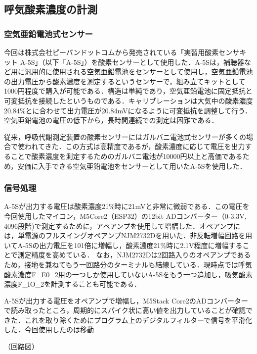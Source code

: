 \subsection{呼気酸素濃度の計測}

\subsubsection{空気亜鉛電池式センサー}

今回は株式会社ピーバンドットコムから発売されている「実習用酸素センサキット A-5S」（以下「A-5S」）を酸素センサーとして使用した．A-5Sは，補聴器など用に汎用的に使用される空気亜鉛電池をセンサーとして使用し，空気亜鉛電池の出力電圧から酸素濃度を測定するというセンサーで，組み立てキットとして1000円程度で購入が可能である．構造は単純であり，空気亜鉛電池に固定抵抗と可変抵抗を接続したというものである．キャリブレーションは大気中の酸素濃度20.84\%とに合わせて出力電圧が20.84mVになるように可変抵抗を調整して行う．空気亜鉛電池の電圧の低下から，長時間連続での測定は困難である．

従来，呼吸代謝測定装置の酸素センサーにはガルバニ電池式センサーが多くの場合で使われてきた．この方式は高精度であるが，酸素濃度に応じて電圧を出力することで酸素濃度を測定するためのガルバニ電池が10000円以上と高価であるため，安価に入手できる空気亜鉛電池をセンサーとして用いたA-5Sを使用した．

\subsubsection{信号処理}

A-5Sが出力する電圧は酸素濃度21\%時に21mVと非常に微弱である．この電圧を今回使用したマイコン，M5Core2（ESP32）の12bit ADコンバーター（0-3.3V, 4096段階)で測定するために，アペアンプを使用して増幅した．オペアンプには，単電源のフルスイングオペアンプNJM2732Dを用いた．非反転増幅回路を用いてA-5Sの出力電圧を101倍に増幅し，酸素濃度21\%時に2.1V程度に増幅することで測定精度を高めている．
なお，NJM2732Dは2回路入りのオペアンプであるため，接地を兼ねてもう一回路分のターミナルも結線している．現時点では呼気酸素濃度F_E0_2用の一つしか使用していないA-5Sをもう一つ追加し，吸気酸素濃度F_IO_2を計測することも可能である．

A-5Sが出力する電圧をオペアンプで増幅し，M5Stack Core2のADコンバーターで読み取ったところ，周期的にスパイク状に高い値を出力していることが確認できた．これを取り除くためにプログラム上のデジタルフィルターで信号を平滑化した．今回使用したのは移動

（回路図）

